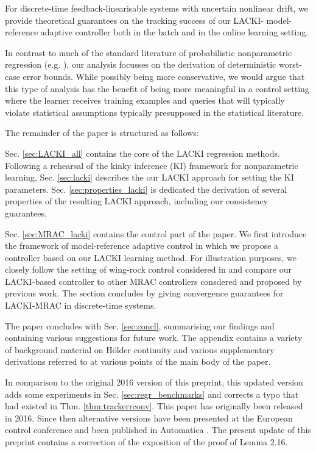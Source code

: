 \documentclass{article} %
\theoremstyle{definition}
\theoremstyle{remark}
\begin{document}
For discrete-time feedback-linearisable systems with uncertain nonlinear drift, we provide theoretical guarantees on the tracking success of our LACKI- model-reference adaptive controller both in the batch and in the online learning setting. 

In contrast to much of the standard literature of probabilistic nonparametric regression (e.g. \cite{Gyoerfi2002,Tsybakov2009}), our analysis focusses on the derivation of deterministic  worst-case error bounds. While possibly being more conservative, we would argue that this type of analysis has the benefit of being more meaningful in a control setting where the learner receives training examples and queries that will typically violate statistical assumptions typically presupposed  in the statistical literature.

The remainder of the paper is structured as follows: 

Sec. \ref{sec:LACKI_all} contains the core of the LACKI regression methods. Following a rehearsal of the kinky inference (KI) framework for nonparametric learning, Sec. \ref{sec:lacki} describes the our LACKI approach for setting the KI parameters. Sec. \ref{sec:properties_lacki} is dedicated the derivation of several properties of the resulting LACKI approach, including our consistency guarantees.

Sec. \ref{sec:MRAC_lacki} contains the control part of the paper. We first introduce the framework of model-reference adaptive control in which we propose a controller based on our LACKI learning method.  For illustration purposes, we closely follow the setting of wing-rock control considered in \cite{Chowdhary2013,ChowdharyCDC2013} and compare our LACKI-based controller to other MRAC controllers consdered and proposed by previous work. The section concludes by giving convergence guarantees for LACKI-MRAC in discrete-time systems.

The paper concludes with Sec. \ref{sec:concl}, summarising our findings and containing various suggestions for future work. The appendix contains a variety of background material on 
H\"older continuity and various supplementary derivations referred to at various points of the main body of the paper. 

In comparison to the original 2016 version of this preprint, this updated version adds some experiments in Sec. \ref{sec:regr_benchmarks} and corrects a typo that had existed in Thm. \ref{thm:trackerrconv}.
This paper has originally been released in 2016. Since then alternative versions have been presented at the  European control conference \cite{calliess2018ECC} and been published in Automatica \cite{calliess2020Automatica}. The present update of this preprint contains a correction of the exposition of the proof of Lemma 2.16.
\end{document}

